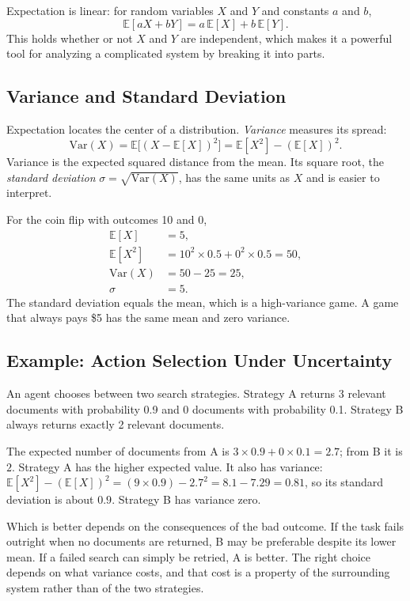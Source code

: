 \documentclass[11pt]{book}
\begin{document}
Expectation is linear: for random variables $X$ and $Y$ and constants $a$ and $b$,
\[
\mathbb{E}[aX + bY] = a\,\mathbb{E}[X] + b\,\mathbb{E}[Y].
\]
This holds whether or not $X$ and $Y$ are independent, which makes it a powerful tool for analyzing a complicated system by breaking it into parts.

\subsection{Variance and Standard Deviation}

Expectation locates the center of a distribution. \emph{Variance} measures its spread:
\[
\text{Var}(X) = \mathbb{E}\big[(X - \mathbb{E}[X])^2\big] = \mathbb{E}[X^2] - (\mathbb{E}[X])^2.
\]
Variance is the expected squared distance from the mean. Its square root, the \emph{standard deviation} $\sigma = \sqrt{\text{Var}(X)}$, has the same units as $X$ and is easier to interpret.

For the coin flip with outcomes 10 and 0,
\begin{align*}
\mathbb{E}[X] &= 5, \\
\mathbb{E}[X^2] &= 10^2 \times 0.5 + 0^2 \times 0.5 = 50, \\
\text{Var}(X) &= 50 - 25 = 25, \\
\sigma &= 5.
\end{align*}
The standard deviation equals the mean, which is a high-variance game. A game that always pays \$5 has the same mean and zero variance.

\subsection{Example: Action Selection Under Uncertainty}

An agent chooses between two search strategies. Strategy A returns 3 relevant documents with probability 0.9 and 0 documents with probability 0.1. Strategy B always returns exactly 2 relevant documents.

The expected number of documents from A is $3 \times 0.9 + 0 \times 0.1 = 2.7$; from B it is $2$. Strategy A has the higher expected value. It also has variance: $\mathbb{E}[X^2] - (\mathbb{E}[X])^2 = (9 \times 0.9) - 2.7^2 = 8.1 - 7.29 = 0.81$, so its standard deviation is about $0.9$. Strategy B has variance zero.

Which is better depends on the consequences of the bad outcome. If the task fails outright when no documents are returned, B may be preferable despite its lower mean. If a failed search can simply be retried, A is better. The right choice depends on what variance costs, and that cost is a property of the surrounding system rather than of the two strategies.
\end{document}
